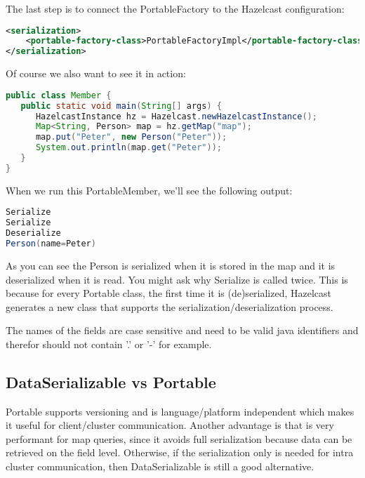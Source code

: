 The last step is to connect the PortableFactory to the Hazelcast configuration:
\begin{lstlisting}[language=xml]
<serialization>
    <portable-factory-class>PortableFactoryImpl</portable-factory-class>
</serialization>
\end{lstlisting}
Of course we also want to see it in action:
\begin{lstlisting}[language=java]
public class Member {
   public static void main(String[] args) {
      HazelcastInstance hz = Hazelcast.newHazelcastInstance();
      Map<String, Person> map = hz.getMap("map");
      map.put("Peter", new Person("Peter"));
      System.out.println(map.get("Peter"));
   }
}
\end{lstlisting}
When we run this PortableMember, we'll see the following output:
\begin{lstlisting}[language=java]
Serialize
Serialize
Deserialize
Person(name=Peter)
\end{lstlisting}
As you can see the Person is serialized when it is stored in the map and it is deserialized when it is read. You might ask why Serialize is called twice. This is because for every Portable class, the first time it is (de)serialized, Hazelcast generates a new class that supports the serialization/deserialization process. 

The names of the fields are case sensitive and need to be valid java identifiers and therefor should not contain '.' or '-' for example. 

\subsection{DataSerializable vs Portable}
Portable supports versioning and is language/platform independent which makes it useful for client/cluster communication. Another advantage is that is very performant for map queries, since it avoids full serialization because data can be retrieved on the field level. Otherwise, if the serialization only is needed for intra cluster communication, then DataSerializable is still a good alternative.

